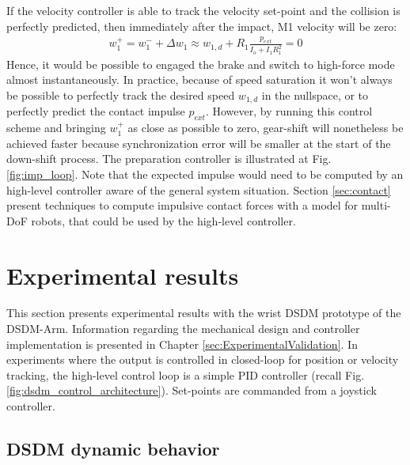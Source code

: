 If the velocity controller is able to track the velocity set-point and the collision is perfectly predicted, then immediately after the impact, M1 velocity will be zero:
%
\begin{align}
w_1^+ =  w_1^- + \Delta w_1 \approx w_{1,d}  + R_1 \frac{ p_{ext} }{I_o + I_1 R_1^2} = 0
\label{eq:dsdm_impact_vel}
\end{align}
%
Hence, it would be possible to engaged the brake and switch to high-force mode almost instantaneously. In practice, because of speed saturation it won't always be possible to perfectly track the desired speed $w_{1,d}$ in the nullspace, or to perfectly predict the contact impulse $p_{ext}$. However, by running this control scheme and bringing $w_1^+$ as close as possible to zero, gear-shift will nonetheless be achieved faster because synchronization error will be smaller at the start of the down-shift process.
%
The preparation controller is illustrated at Fig. \ref{fig:imp_loop}. Note that the expected impulse would need to be computed by an high-level controller aware of the general system situation. Section \ref{sec:contact} present techniques to compute impulsive contact forces with a model for multi-DoF robots, that could be used by the high-level controller. 




\newpage

\section{Experimental results}
\label{sec:dsdm_exp}

This section presents experimental results with the wrist DSDM prototype of the DSDM-Arm. Information regarding the mechanical design and controller implementation is presented in Chapter \ref{sec:ExperimentalValidation}. In experiments where the output is controlled in closed-loop for position or velocity tracking, the high-level control loop is a simple PID controller (recall Fig. \ref{fig:dsdm_control_architecture}). Set-points are commanded from a joystick controller. 

\subsection{DSDM dynamic behavior}

